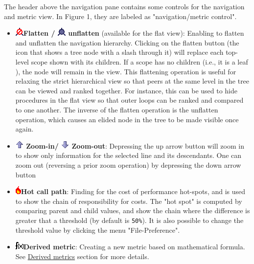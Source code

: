 \documentclass[a4paper,11pt]{article}
\begin{document}
 The header above the navigation pane contains some controls for the  navigation and metric view. In Figure 1, they are labeled as "navigation/metric control".  
\begin{itemize}
	\item 
\includegraphics{images/Flatten.gif}\textbf{Flatten / 
\includegraphics{images/Unflatten.gif} unflatten} (available for the flat view): Enabling to flatten and unflatten  the navigation hierarchy. Clicking on the flatten button (the icon that  shows a tree node with a slash through it) will replace each top-level  scope shown with its children. If a scope has no children (i.e., it is a  leaf ), the node will remain in the view. This flattening operation is  useful for relaxing the strict hierarchical view so that peers at the same  level in the tree can be viewed and ranked together. For instance, this  can be used to hide procedures in the flat view so that outer loops  can be ranked and compared to one another. The inverse of the flatten  operation is the unflatten operation, which causes an elided node in  the tree to be made visible once again.  
	\item \textbf{
\includegraphics{images/ZoomIn.gif} Zoom-in/ 
\includegraphics{images/ZoomOut.gif} Zoom-out}: Depressing the up arrow button will zoom in to show only information for the selected line and its descendants. One can zoom out  (reversing a prior zoom operation) by depressing the down arrow button
	\item 
\includegraphics{images/flameIcon.gif}\textbf{Hot call path}: Finding for the cost of performance hot-spots, and is used to show the chain of responsibility for costs.  The "hot spot" is computed by comparing parent and child values, and show the chain where the difference is greater that a threshold   (by default is 
\texttt{50\%}). It is also possible to change the threshold value by clicking the menu "File-Preference".
	\item 
\includegraphics{images/FnMetric.gif}\textbf{Derived metric}: Creating a new metric based on mathematical formula.   See \hyperlink{derivedmetrics}{Derived metrics} section for more details.

\end{itemize}
\end{document}
